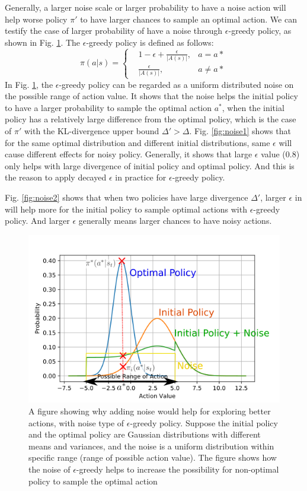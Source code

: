 \documentclass{article}
\begin{document}
Generally, a larger noise scale or larger probability to have a noise action will help worse policy $\pi'$ to have larger chances to sample an optimal action. We can testify the case of larger probability of have a noise through $\epsilon$-greedy policy, as shown in Fig. \ref{fig:noise}. The $\epsilon$-greedy policy is defined as follows:
\begin{equation}
\pi(a|s)=\left\{
\begin{aligned}
&1-\epsilon+\frac{\epsilon}{|A(s)|}, &a=a* \\
&\frac{\epsilon}{|A(s)|}, &a\neq a*
\end{aligned}
\right.
\end{equation}
In Fig. \ref{fig:noise}, the $\epsilon$-greedy policy can be regarded as a uniform distributed noise on the possible range of action value. It shows that the noise helps the initial policy to have a larger probability to sample the optimal action $a^*$, when the initial policy has a relatively large difference from the optimal policy, which is the case of $\pi'$ with the KL-divergence upper bound  $\Delta'>\Delta$. Fig. \ref{fig:noise1} shows that for the same optimal distribution and different initial distributions, same $\epsilon$ will cause different effects for noisy policy. Generally, it shows that large $\epsilon$ value (0.8) only helps with large divergence of initial policy and optimal policy. And this is the reason to apply decayed $\epsilon$ in practice for $\epsilon$-greedy policy.

Fig. \ref{fig:noise2} shows that when two policies have large divergence $\Delta'$, larger $\epsilon$ in will help more for the initial policy to sample optimal actions with $\epsilon$-greedy policy. And larger $\epsilon$ generally means larger chances to have noisy actions.
\begin{figure}[htbp]
	\centering
	\includegraphics[scale=0.8]{img/noise2.png}
	\caption{A figure showing why adding noise would help for exploring better actions, with noise type of $\epsilon$-greedy policy. Suppose the initial policy and the optimal policy are Gaussian distributions with different means and variances, and the noise is a uniform distribution within specific range (range of possible action value). The figure shows how the noise of $\epsilon$-greedy helps to increase the possibility for non-optimal policy to sample the optimal action }
	\label{fig:noise}
\end{figure}
\end{document}
